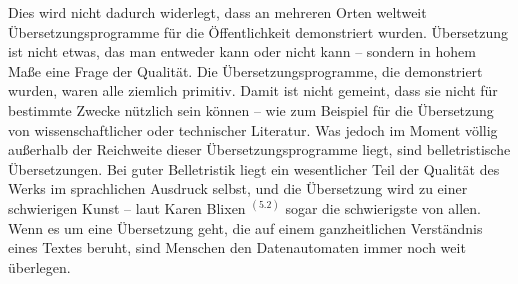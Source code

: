 {Dies wird nicht dadurch widerlegt, dass an mehreren Orten weltweit Übersetzungsprogramme für die Öffentlichkeit demonstriert wurden. Übersetzung ist nicht etwas, das man entweder kann oder nicht kann -- sondern in hohem Maße eine Frage der Qualität. Die Übersetzungsprogramme, die demonstriert wurden, waren alle ziemlich primitiv. Damit ist nicht gemeint, dass sie nicht für bestimmte Zwecke nützlich sein können -- wie zum Beispiel für die Übersetzung von wissenschaftlicher oder technischer Literatur. Was jedoch im Moment völlig außerhalb der Reichweite dieser Übersetzungsprogramme liegt, sind belletristische Übersetzungen. Bei guter Belletristik liegt ein wesentlicher Teil der Qualität des Werks im sprachlichen Ausdruck selbst, und die Übersetzung wird zu einer schwierigen Kunst -- laut Karen Blixen $^{(5.2)}$ sogar die schwierigste von allen. Wenn es um eine Übersetzung geht, die auf einem ganzheitlichen Verständnis eines Textes beruht, sind Menschen den Datenautomaten immer noch weit überlegen.
}



